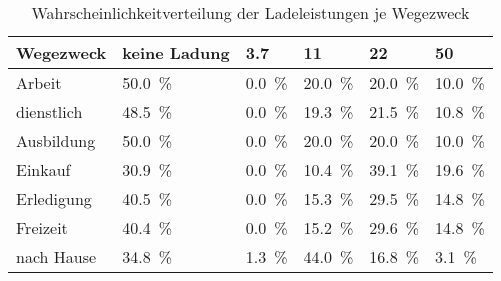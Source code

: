 {
\renewcommand{\arraystretch}{1.2}%
\begin{table}[H]
	\begin{center}
		\caption{Wahrscheinlichkeitverteilung der Ladeleistungen je Wegezweck}
		\begin{tabu} to \textwidth {X[1.2] X[1.2, r] X[1, r] X[1, r] X[1, r] X[1, r]}
			\hline
			Wegezweck  & keine Ladung        & \SI{3.7}{\kw}      & \SI{11}{\kw}        & \SI{22}{\kw}        & \SI{50}{\kw}        \\ \hline
			Arbeit     & \SI{50.0}{\percent} & \SI{0.0}{\percent} & \SI{20.0}{\percent} & \SI{20.0}{\percent} & \SI{10.0}{\percent} \\
			dienstlich & \SI{48.5}{\percent} & \SI{0.0}{\percent} & \SI{19.3}{\percent} & \SI{21.5}{\percent} & \SI{10.8}{\percent} \\
			Ausbildung & \SI{50.0}{\percent} & \SI{0.0}{\percent} & \SI{20.0}{\percent} & \SI{20.0}{\percent} & \SI{10.0}{\percent} \\
			Einkauf    & \SI{30.9}{\percent} & \SI{0.0}{\percent} & \SI{10.4}{\percent} & \SI{39.1}{\percent} & \SI{19.6}{\percent} \\
			Erledigung & \SI{40.5}{\percent} & \SI{0.0}{\percent} & \SI{15.3}{\percent} & \SI{29.5}{\percent} & \SI{14.8}{\percent} \\
			Freizeit   & \SI{40.4}{\percent} & \SI{0.0}{\percent} & \SI{15.2}{\percent} & \SI{29.6}{\percent} & \SI{14.8}{\percent} \\
			nach Hause & \SI{34.8}{\percent} & \SI{1.3}{\percent} & \SI{44.0}{\percent} & \SI{16.8}{\percent} & \SI{3.1}{\percent}  \\ \hline
		\end{tabu}
		\label{tab:WegezweckProbability2050}
	\end{center}
	\vspace{-3mm}%
\end{table}
}